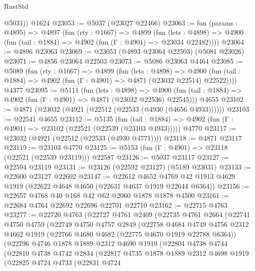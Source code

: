 \begin{lexlean}{RustStd}
\begin{coremodule}
        @5031))
    @1624
@23053 := @5037 (@23027 @22466)
@23063 := fun (params : @4895) =>
  @4897
    (fun (rty : @1667) =>
    @4899
      (fun (lets : @4898) =>
      @4900 (fun (tail : @1884) => @4902 (fun (Γ : @4901) => @23034 @22482))))
@23064 := @4896 @23063
@23069 := @23053 (@4893 @23064 @22503) (@5081 @23026)
@23071 := @4856 @23064 @22503
@23073 := @5086 @23063 @4464
@23085 := @5089
    (fun (rty : @1667) =>
    @4899
      (fun (lets : @4898) =>
      @4900 (fun (tail : @1884) => @4902 (fun (Γ : @4901) => @4871 (@23032 @22514) @22522))))
    @4377
@23095 := @5111
    (fun (lets : @4898) =>
    @4900 (fun (tail : @1884) => @4902 (fun (Γ : @4901) => @4871 (@23032 @22536) @22545)))
    @4655
@23102 := @4871 (@23032 (@4921 (@22512 (@22533 (@4930 (@4656 @4933))))))
@23103 := @22541 @4655
@23112 := @5135
    (fun (tail : @1884) => @4902 (fun (Γ : @4901) => @23102 (@22521 (@22539 (@23103 @4933)))))
    @4770
@23117 := @23032 (@4921 (@22512 (@22533 (@4930 @4771))))
@23118 := @4871 @23117
@23119 := @23103 @4770
@23125 := @5153 (fun (Γ : @4901) => @23118 (@22521 (@22539 @23119))) @22587
@23126 := @5037 @23117
@23127 := @22594 @23119
@23131 := @23126 (@22592 @23127) (@5189 @23031)
@23133 := @22600 @23127 @22602
@23147 := @22612
    @4652
    @4769
    @42
    @1913
    @4629
    @1919
    (@22622 @4648 @4650 (@22631 @4637 @1919 @22644 @6364))
@23156 := @22657 @4768 @40 @168 @42 @62 @2060 @1878 @1878 @4500
@23161 := @22684 @4764 @22692 @22696 @22701 @22710
@23162 := @22715 @4763
@23277 := @22720
    @4763
    (@22727
      @4761
      @2409
      (@22735
        @4761
        @2664
        (@22741
          @4750
          @4759
          (@22749
            @4750
            @4757
            @2849
            (@22758
              @4684
              @4749
              @4756
              @2312
              @4662
              @1919
              (@22766 @4680 @4682 (@22775 @4670 @1919 @22788 @6364))
              (@22796
                @4746
                @1878
                @1889
                @2312
                @4690
                @1919
                (@22804
                  @4738
                  @4744
                  (@22810
                    @4738
                    @4742
                    @2834
                    (@22817
                      @4735
                      @1878
                      @1889
                      @2312
                      @4698
                      @1919
                      (@22825
                        @4724
                        @4733
                        (@22831
                          @4724

\end{coremodule}
\end{lexlean}
